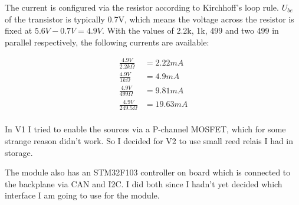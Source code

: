 The current is configured via the resistor according to Kirchhoff's loop rule. $U_{be}$ of the transistor is typically 0.7V, which means the voltage across the resistor is fixed at $5.6V - 0.7V = 4.9V$. With the values of 2.2k, 1k, 499 and two 499 in parallel respectively, the following currents are available:

\begin{align*}
	\frac{4.9V}{2.2 k\Omega} & = 2.22 mA\\
	\frac{4.9V}{1 k\Omega}  & = 4.9  mA\\
	\frac{4.9V}{499 \Omega} & = 9.81 mA\\
	\frac{4.9V}{249.5 \Omega} & = 19.63 mA\\
\end{align*}

In V1 I tried to enable the sources via a P-channel MOSFET, which for some strange reason didn't work. So I decided for V2 to use small reed relais I had in storage. 

\vspace{1cm}

The module also has an STM32F103 controller on board which is connected to the backplane via CAN and I2C. I did both since I hadn't yet decided which interface I am going to use for the module. 

